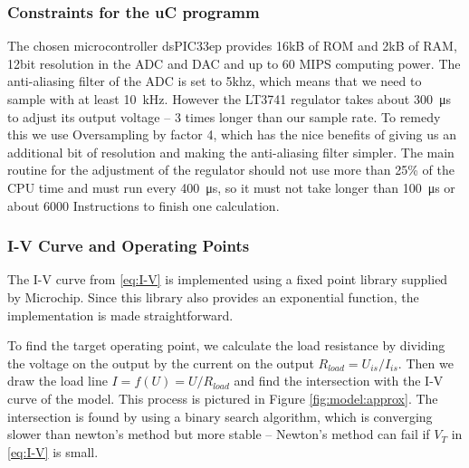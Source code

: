 

\subsubsection{Constraints for the uC programm}

The chosen  microcontroller dsPIC33ep  provides 16kB  of ROM  and 2kB  of RAM,
12bit resolution  in the ADC  and DAC and up  to 60 MIPS  computing power. The
anti-aliasing filter of  the ADC is set  to 5khz, which means that  we need to
sample with at least  \SI{10}{\kilo\hertz}. However the LT3741 regulator takes
about \SI{300}{\micro\second} to  adjust its output voltage --  3 times longer
than our  sample rate. To remedy this  we use Oversampling by  factor 4, which
has  the nice  benefits  of giving  us  an additional  bit  of resolution  and
making the anti-aliasing  filter simpler. The main routine  for the adjustment
of  the  regulator  should  not  use  more than  25\%  of  the  CPU  time  and
must  run every  \SI{400}{\micro\second},  so  it must  not  take longer  than
\SI{100}{\micro\second} or about 6000 Instructions to finish one calculation.


\subsubsection{I-V Curve and Operating Points}
\label{subsec:iv-curve-operating-points}

The  I-V  curve  from  \eqref{eq:I-V} is implemented using a fixed point  library
supplied by Microchip. Since this library also provides an exponential function,
the implementation is made straightforward.

To  find the  target  operating point,  we calculate  the  load resistance  by
dividing the voltage  on the output by  the current on the  output $R_{load} =
U_{is} /  I_{is}$. Then we draw the  load line $I =  f(U) = U /  R_{load}$ and
find  the intersection  with the  I-V  curve of  the model.   This process  is
pictured in Figure \ref{fig:model:approx}.  The intersection is found by using
a binary search algorithm, which is converging slower than newton's method but
more stable -- Newton's method can fail if $V_T$ in \eqref{eq:I-V} is small.

